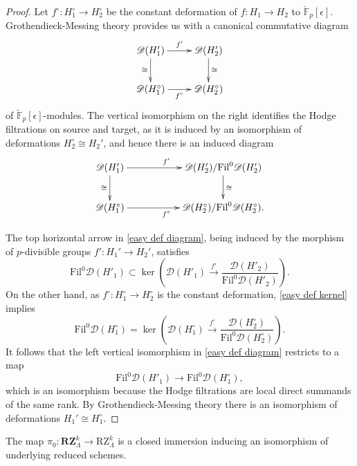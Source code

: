 \documentclass[11pt]{alggeom}
\newcommand{\map}[1]{\xrightarrow{#1}}
\newcommand{\iso}{\cong}
\newcommand{\F}{\mathbb F}
\begin{document}
\begin{proof}
Let $f^\circ : H_1^\circ \to H_2^\circ$ be the constant deformation of $f:H_1 \to H_2$ to $\breve{\F}_p[\epsilon]$.
Grothendieck-Messing theory provides us with a  canonical commutative diagram
\[
\xymatrix{
{  \mathscr{D}(H_1') }     \ar[r]^{f'}     \ar[d]_\iso   & {    \mathscr{D}(H_2') }  \ar[d]^\iso    \\ 
  { \mathscr{D}(H_1^\circ) }   \ar[r]_{f^\circ}&   {  \mathscr{D}(H_2^\circ)   }      \\
}
\]
of $\breve{\F}_p[\epsilon]$-modules. 
 The vertical isomorphism on the right identifies the Hodge filtrations on source and target, as it is induced by an isomorphism of deformations $H_2^\circ \iso H_2'$, and 
hence there is an induced diagram
 \begin{equation}\label{easy def diagram}
\xymatrix{
{  \mathscr{D}(H_1') }     \ar[rr]^{f'}  \ar[d]_\iso  &  &  {    \mathscr{D}(H_2') / \mathrm{Fil}^0 \mathscr{D}(H'_2) }   \ar[d]^\iso     \\ 
  { \mathscr{D}(H_1^\circ) }   \ar[rr]_{f^\circ}    &  &   {  \mathscr{D}(H_2^\circ) / \mathrm{Fil}^0 \mathscr{D}(H^\circ_2)  } .    \\
}
\end{equation}


The top  horizontal arrow in \eqref{easy def diagram}, being induced by the morphism of $p$-divisible groups $f' : H_1' \to H_2'$,    satisfies
 \[
\mathrm{Fil}^0 \mathscr{D} (H'_1)  
\subset \ker \left(  \mathscr{D} (H'_1) \map{f'}  \frac{ \mathscr{D}(H'_2) } { \mathrm{Fil}^0 \mathscr{D}(H'_2) } \right) .
\]
On the other hand,  as $f^\circ : H_1^\circ \to H_2^\circ$ is the constant deformation, \eqref{easy def kernel} implies
\[
\mathrm{Fil}^0 \mathscr{D} (H^\circ_1)  
 =  \ker \left(  \mathscr{D} (H^\circ_1) \map{f^\circ}  \frac{ \mathscr{D}(H^\circ_2) }{  \mathrm{Fil}^0 \mathscr{D}(H^\circ_2) } \right) .
\]
It follows that the left vertical isomorphism in \eqref{easy def diagram} restricts to a map 
\[
\mathrm{Fil}^0 \mathscr{D} (H'_1) \to \mathrm{Fil}^0 \mathscr{D} (H^\circ_1), 
\]
which is an isomorphism because the Hodge filtrations are local direct summands of the same rank.
By  Grothendieck-Messing theory there is an isomorphism of deformations $H_1' \iso H_1^\circ$. 
\end{proof}




\begin{proposition}\label{prop:pi_0 isomorphism}
The map $\pi_0 :  \mathbf{RZ}_\Lambda^k  \to  \mathrm{RZ}_\Lambda^k$ is a closed immersion  inducing an isomorphism of underlying reduced schemes.
\end{proposition}
\end{document}
